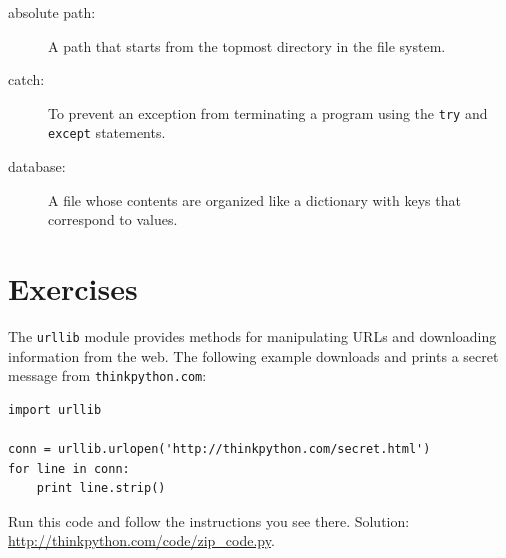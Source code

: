\documentclass[10pt]{book}
\begin{document}
\begin{CJK}{UTF8}{gbsn}
\begin{description}
\item[absolute path:] A path that starts from the topmost directory
in the file system.

\item[catch:] To prevent an exception from terminating
a program using the {\tt try}
and {\tt except} statements.

\item[database:] A file whose contents are organized like a dictionary
with keys that correspond to values.

\end{description}


\section{Exercises}

\begin{exercise}
\label{urllib}

The {\tt urllib} module provides methods for manipulating URLs
and downloading information from the web.  The following example
downloads and prints a secret message from {\tt thinkpython.com}:

\begin{verbatim}
import urllib

conn = urllib.urlopen('http://thinkpython.com/secret.html')
for line in conn:
    print line.strip()
\end{verbatim}

Run this code and follow the instructions you see there.
Solution: \url{http://thinkpython.com/code/zip_code.py}.

\end{exercise}






\end{CJK}
\end{document}
